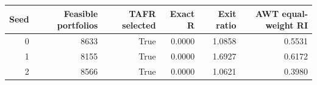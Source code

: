 \begin{tabular}{rrrrrr}
\toprule
Seed & Feasible portfolios & TAFR selected & Exact R & Exit ratio & AWT equal-weight RI \\
\midrule
0 & 8633 & True & 0.0000 & 1.0858 & 0.5531 \\
1 & 8155 & True & 0.0000 & 1.6927 & 0.6172 \\
2 & 8566 & True & 0.0000 & 1.0621 & 0.3980 \\
\bottomrule
\end{tabular}
